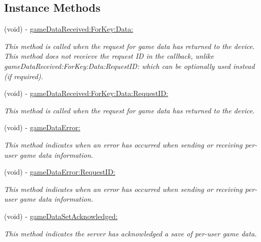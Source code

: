 \subsection*{Instance Methods}
\begin{DoxyCompactItemize}
\item 
(void) -\/ \hyperlink{protocol_fuse_game_data_delegate-p_a779286e74bd187861e72baa22c4a1c90}{game\+Data\+Received\+:\+For\+Key\+:\+Data\+:}
\begin{DoxyCompactList}\small\item\em This method is called when the request for game data has returned to the device. This method does not receieve the request I\+D in the callback, unlike game\+Data\+Received\+:\+For\+Key\+:\+Data\+:\+Request\+I\+D\+: which can be optionally used instead (if required). \end{DoxyCompactList}\item 
(void) -\/ \hyperlink{protocol_fuse_game_data_delegate-p_ad4381e7c5b070343b22d62a337ccd8a8}{game\+Data\+Received\+:\+For\+Key\+:\+Data\+:\+Request\+I\+D\+:}
\begin{DoxyCompactList}\small\item\em This method is called when the request for game data has returned to the device. \end{DoxyCompactList}\item 
(void) -\/ \hyperlink{protocol_fuse_game_data_delegate-p_ae30d8baf6c1114c83a39d1cb4bd8bdd0}{game\+Data\+Error\+:}
\begin{DoxyCompactList}\small\item\em This method indicates when an error has occurred when sending or receiving per-\/user game data information. \end{DoxyCompactList}\item 
(void) -\/ \hyperlink{protocol_fuse_game_data_delegate-p_ab2b869abbcd0fdb1ca5ccf4bddfb6f00}{game\+Data\+Error\+:\+Request\+I\+D\+:}
\begin{DoxyCompactList}\small\item\em This method indicates when an error has occurred when sending or receiving per-\/user game data information. \end{DoxyCompactList}\item 
(void) -\/ \hyperlink{protocol_fuse_game_data_delegate-p_a9888e6aaf263e84a9086e4e80fc01c15}{game\+Data\+Set\+Acknowledged\+:}
\begin{DoxyCompactList}\small\item\em This method indicates the server has acknowledged a save of per-\/user game data. \end{DoxyCompactList}\end{DoxyCompactItemize}



